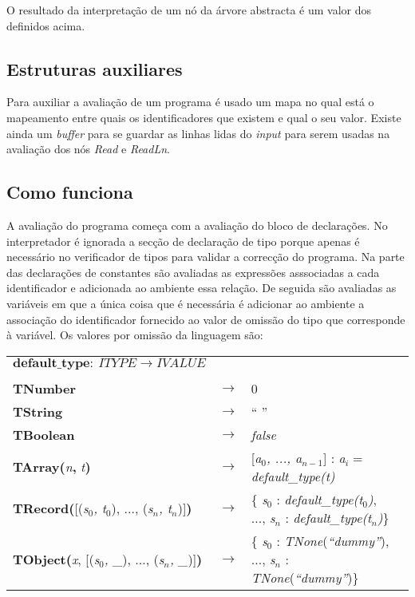 O resultado da interpretação de um nó da árvore abstracta é um valor dos definidos acima.

\subsection{Estruturas auxiliares}

Para auxiliar a avaliação de um programa é usado um mapa no qual está o mapeamento entre quais os identificadores que existem e qual o seu valor. Existe ainda um \emph{buffer} para se guardar as linhas lidas do \emph{input} para serem usadas na avaliação dos nós \emph{Read} e \emph{ReadLn}.

\subsection{Como funciona}
A avaliação do programa começa com a avaliação do bloco de declarações. No interpretador é ignorada a secção de declaração de tipo porque apenas é necessário no verificador de tipos para validar a correcção do programa. Na parte das declarações de constantes são avaliadas as expressões asssociadas a cada identificador e adicionada ao ambiente essa relação. De seguida são avaliadas as variáveis em que a única coisa que é necessária é adicionar ao ambiente a associação do identificador fornecido ao valor de omissão do tipo que corresponde à variável. Os valores por omissão da linguagem são:

{
\fontsize{9pt}{10}\selectfont
\begin{tabular}{llll}
$\textbf{default\_type}:~ITYPE \rightarrow IVALUE$\\\\
\textbf{TNumber}														&$\rightarrow$ 	&0\\
\textbf{TString}														&$\rightarrow$ 	&`` ''\\
\textbf{TBoolean}														&$\rightarrow$ 	&\emph{false}\\
\textbf{TArray(}\emph{n}\textbf{,} \emph{t}\textbf{)}										&$\rightarrow$ 	&[\emph{a$_0$, ..., a$_{n-1}$}] : \emph{a$_i = $ default\_type(t) }\\
\textbf{TRecord(}[(\emph{s$_0$, t$_0$}), ..., (\emph{s$_n$, t$_n$})]\textbf{)}	&$\rightarrow$ 	&\{ \emph{s$_0$} : \emph{default\_type(t$_0$)}, ..., \emph{s$_n$} : \emph{default\_type(t$_n$)}\}\\
\textbf{TObject(}\emph{x}, [(\emph{s$_0$, \_}), ..., (\emph{s$_n$, \_})]\textbf{)}	&$\rightarrow$	&\{ \emph{s$_0$} : \emph{TNone}(\emph{``dummy''}), ..., \emph{s$_n$} : \emph{TNone}(\emph{``dummy''})\}
\end{tabular}
}\\

